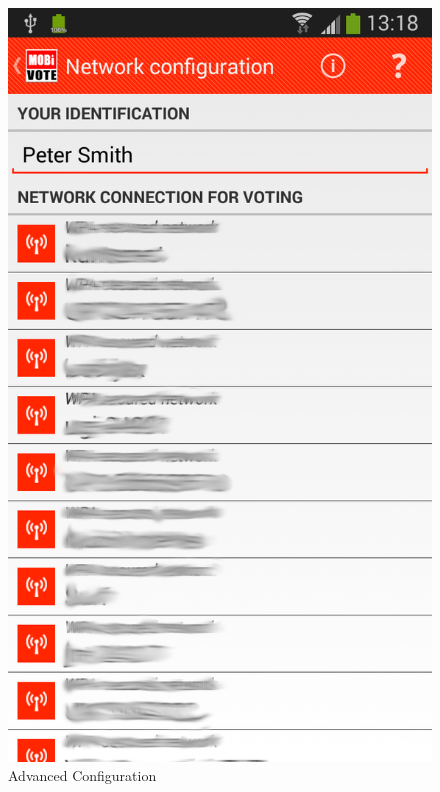 \documentclass[numbers=noenddot, abstract=on, a4paper, headsepline,
footsepline, oneside, draft=off]{scrreprt}
\begin{document}
\begin{figure}[!htb]
	\begin{minipage}{.5\textwidth}
  		\centering
		\includegraphics[height=.4\textheight]{img/screenshots/advanced_network_configuration}
		\caption{Advanced Configuration}
		\label{fig:handbook_advancedconfigurationuser}
	\end{minipage}
	\begin{minipage}{.5\textwidth}
  		\centering

\end{minipage}
\end{figure}
\end{document}
